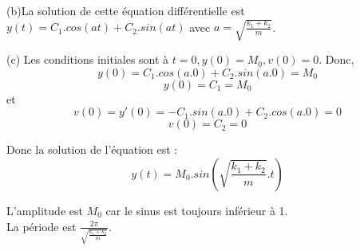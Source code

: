 \documentclass[]{book}
\theoremstyle{definition}
\begin{document}
(b)La solution de cette \'equation diff\'erentielle est $y(t) = C_1.cos(at) + C_2.sin(at)$ avec $a = \sqrt{\frac{k_1+k_2}{m}}$.


(c) Les conditions initiales sont \`a $t=0, y(0) = M_0, v(0) = 0$. Donc,
$$y(0) = C_1.cos(a.0) + C_2.sin(a.0) = M_0$$
$$y(0) = C_1 = M_0$$
et
$$v(0) = y'(0) = -C_1.sin(a.0) +C_2.cos(a.0) = 0$$
$$v(0) = C_2 = 0$$

Donc la solution de l'\'equation est :
$$y(t) = M_0.sin(\sqrt{\frac{k_1+k_2}{m}}.t)$$

L'amplitude est $M_0$ car le sinus est toujours inf\'erieur \`a 1. \\
La p\'eriode est $\frac{2\pi}{\sqrt{\frac{k_1+k_2}{m}}}$.
\end{document}
